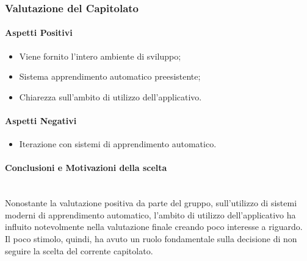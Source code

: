 \subsubsection{Valutazione del Capitolato}

\paragraph{Aspetti Positivi}
\begin{itemize}
	\item Viene fornito l'intero ambiente di sviluppo;
	\item Sistema apprendimento automatico preesistente;
	\item Chiarezza sull'ambito di utilizzo dell'applicativo.
\end{itemize}

\paragraph{Aspetti Negativi}
\begin{itemize}
	\item Iterazione con sistemi di apprendimento automatico.
\end{itemize}

\paragraph{Conclusioni e Motivazioni della scelta} \-\\
Nonostante la valutazione positiva da parte del gruppo, sull'utilizzo di sistemi moderni di apprendimento automatico, l'ambito di utilizzo dell'applicativo ha influito notevolmente nella valutazione finale creando poco interesse a riguardo.\\
Il poco stimolo, quindi, ha avuto un ruolo fondamentale sulla decisione di non seguire la scelta del corrente capitolato.